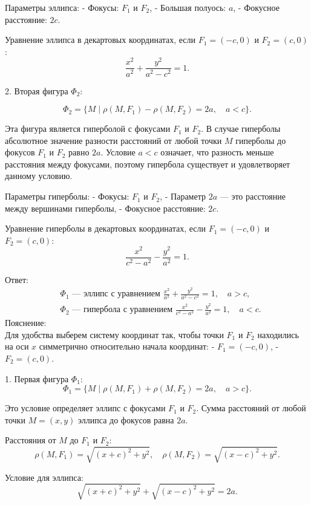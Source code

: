 \documentclass[a4paper,14pt]{extreport} %
\begin{document}
   Параметры эллипса:
   - Фокусы: \( F_1 \) и \( F_2 \),
   - Большая полуось: \( a \),
   - Фокусное расстояние: \( 2c \).

   Уравнение эллипса в декартовых координатах, если \( F_1 = (-c, 0) \) и \( F_2 = (c, 0) \):
   \[
   \frac{x^2}{a^2} + \frac{y^2}{a^2 - c^2} = 1.
   \]

2. Вторая фигура \( \Phi_2 \):

   \[
   \Phi_2 = \{ M \mid \rho(M, F_1) - \rho(M, F_2) = 2a, \quad a < c \}.
   \]

   Эта фигура является гиперболой с фокусами \( F_1 \) и \( F_2 \). В случае гиперболы абсолютное значение разности расстояний от любой точки \( M \) гиперболы до фокусов \( F_1 \) и \( F_2 \) равно \( 2a \). Условие \( a < c \) означает, что разность меньше расстояния между фокусами, поэтому гипербола существует и удовлетворяет данному условию.

   Параметры гиперболы:
   - Фокусы: \( F_1 \) и \( F_2 \),
   - Параметр \( 2a \) — это расстояние между вершинами гиперболы,
   - Фокусное расстояние: \( 2c \).

   Уравнение гиперболы в декартовых координатах, если \( F_1 = (-c, 0) \) и \( F_2 = (c, 0) \):
   \[
   \frac{x^2}{c^2 - a^2} - \frac{y^2}{a^2} = 1.
   \]

 Ответ:
\[
\begin{aligned}
    &\Phi_1 \text{ — эллипс с уравнением } \frac{x^2}{a^2} + \frac{y^2}{a^2 - c^2} = 1, \quad a > c, \\
    &\Phi_2 \text{ — гипербола с уравнением } \frac{x^2}{c^2 - a^2} - \frac{y^2}{a^2} = 1, \quad a < c.
\end{aligned}
\]
Пояснение:\\
Для удобства выберем систему координат так, чтобы точки \( F_1 \) и \( F_2 \) находились на оси \( x \) симметрично относительно начала координат:
- \( F_1 = (-c, 0) \),
- \( F_2 = (c, 0) \).

1. Первая фигура \( \Phi_1 \):
   \[
   \Phi_1 = \{ M \mid \rho(M, F_1) + \rho(M, F_2) = 2a, \quad a > c \}.
   \]

   Это условие определяет эллипс с фокусами \( F_1 \) и \( F_2 \). Сумма расстояний от любой точки \( M = (x, y) \) эллипса до фокусов равна \( 2a \).

   Расстояния от \( M \) до \( F_1 \) и \( F_2 \):
   \[
   \rho(M, F_1) = \sqrt{(x + c)^2 + y^2}, \quad \rho(M, F_2) = \sqrt{(x - c)^2 + y^2}.
   \]

   Условие для эллипса:
   \[
   \sqrt{(x + c)^2 + y^2} + \sqrt{(x - c)^2 + y^2} = 2a.
   \]
\end{document}
